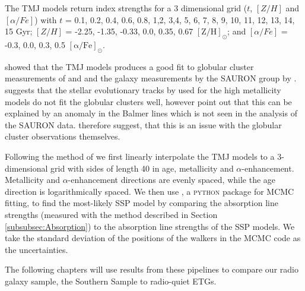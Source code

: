 			The TMJ models return index strengths for a 3 dimensional grid ($t$, $[Z/H]$ and $[\alpha/Fe]$) with $t$ = 0.1, 0.2, 0.4, 0.6, 0.8, 1,2, 3,4, 5, 6, 7, 8, 9, 10, 11, 12, 13, 14, 15 Gyr; $[Z/H]$ = -2.25, -1.35, -0.33, 0.0, 0.35, 0.67 $\mathrm{[Z/H]_\odot}$; and $[\alpha/Fe]$ = -0.3, 0.0, 0.3, 0.5 $\mathrm{[\alpha/Fe]_\odot}$.

			\citet{Thomas2010} showed that the TMJ models produces a good fit to globular cluster measurements of \citet{Puzia2002} and \citet{Schiavon2005} and the galaxy measurements by the SAURON group by \citet{Kuntschner2010}. \citet{Conroy2010} suggests that the stellar evolutionary tracks by \citet{Girardi2000} used for the high metallicity models do not fit the globular clusters well, however \citet{Thomas2010} point out that this can be explained by an anomaly in the Balmer lines which is not seen in the analysis of the SAURON data. \citet{Thomas2010} therefore suggest, that this is an issue with the globular cluster observations themselves. 

			Following the method of \citet{McDermid2006} we first linearly interpolate the TMJ models to a 3-dimensional grid with sides of length 40 in age, metallicity and $\alpha$-enhancement. Metallicity and $\alpha$-enhancement directions are evenly spaced, while the age direction is logarithmically spaced. We then use , a \textsc{python} package for MCMC fitting, to find the most-likely SSP model by comparing the absorption line strengths (measured with the method described in Section \ref{subsubsec:Absorption}) to the absorption line strengths of the SSP models. We take the standard deviation of the positions of the walkers in the MCMC code as the uncertainties.

			The following chapters will use results from these pipelines to compare our radio galaxy sample, the Southern Sample to radio-quiet ETGs.